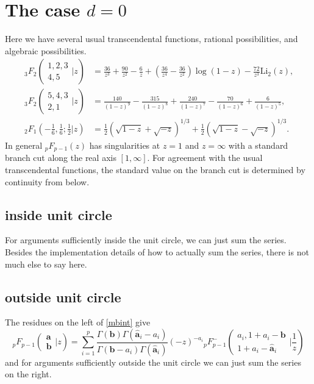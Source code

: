 \documentclass[12pt]{article}
\numberwithin{equation}{section}
\newcommand{\FF}[6] {{}_{#1}{#2}_{#3} \left( \begin{array}{c} #4 \\ #5 \end{array} \Big| {#6}  \right)}
\newcommand{\FFe}[7] {{}_{#1}^{\,}{#2}_{#3}^{#4} \left( \begin{array}{c} #5 \\ #6 \end{array} \Big| {#7} \right)}
\newcommand{\FFf}[5] {{}_{#1}{#2}_{#3} \left(#4 | {#5} \right)}
\begin{document}
\section{The case $d=0$}
Here we have several usual transcendental functions, rational possibilities, and algebraic possibilities.
\begin{align*}
\FF{3}{F}{2}{1,2,3}{4,5}{z} &= \frac{36}{z^3}+\frac{90}{z^2}-\frac{6}{z}+\left
   (\frac{36}{z^4}-\frac{36}{z^2}\right) \log
   (1-z)-\frac{72}{z^3}
   \text{Li}_2(z)\text{,}\\
\FF{3}{F}{2}{5,4,3}{2,1}{z} &= \frac{140}{(1-z)^9}-\frac{315}{(1-z)^8}+\frac{240}{(1-z)^7}-\frac{70}{(1-z)^6}+\frac{6}{(1-z)^5}\text{,}\\
\FFf{2}{F}{1}{-\tfrac{1}{6}, \tfrac{1}{6};\tfrac{1}{2}}{z} &= \tfrac{1}{2} \left(\sqrt{1-z}+\sqrt{-z}\right)^{1/3}+\tfrac{1}{2} \left(\sqrt{1-z}-\sqrt{-z}\right)^{1/3}\text{.}
\end{align*}
In general ${}_{p}F_{p-1}(z)$ has singularities at $z=1$ and $z=\infty$ with a standard branch cut along the real axis $[1,\infty]$. For agreement with the usual transcendental functions, the standard value on the branch cut is determined by continuity from below.

\subsection{inside unit circle}
For arguments sufficiently inside the unit circle, we can just sum the series. Besides the implementation details of how to actually sum the series, there is not much else to say here.

\subsection{outside unit circle}
The residues on the left of \eqref{mbint} give
\begin{equation}
\label{balanced_outside}
\FF{p}{F}{p-1}{\mathbf{a}}{\mathbf{b}}{z} = \sum_{i=1}^{p} \frac{\Gamma(\mathbf{b}) \Gamma(\hat{\mathbf{a}}_i-a_i)}{\Gamma(\mathbf{b}-a_i) \Gamma(\hat{\mathbf{a}}_i)} (-z)^{-a_i} \FFe{p}{F}{p-1}{-}{a_i,1+a_i-\mathbf{b}}{1+a_i-\hat{\mathbf{a}}_i}{\frac{1}{z}}
\end{equation}
and for arguments sufficiently outside the unit circle we can just sum the series on the right.
\end{document}
